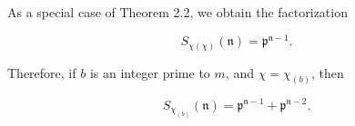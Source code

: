 As a special case of Theorem 2.2, we obtain the factorization

$$S_{\chi(\chi)}(\mathfrak{n}) = \mathfrak{p}^{\mathfrak{n}-1}.$$

Therefore, if $b$ is an integer prime to $m$, and $\chi = \chi_{(b)}$, then

$$S_{\chi_{(b)}}(\mathfrak{n}) = \mathfrak{p}^{\mathfrak{n}-1} + \mathfrak{p}^{\mathfrak{n}-2}.$$
